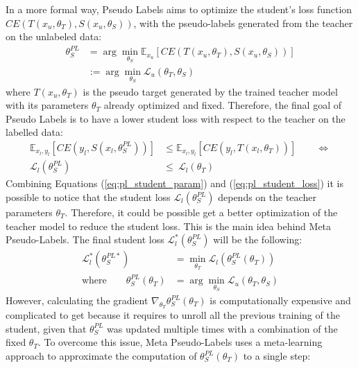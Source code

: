 In a more formal way, Pseudo Labels aims to optimize the student's 
loss function $CE(T(x_u, \theta_T), S(x_u, \theta_S))$, with the pseudo-labels 
generated from the teacher on the unlabeled data:
\begin{align}
    \theta_S^{PL} &= \arg \min_{\theta_S} \mathbb{E}_{x_u}\left[
        {CE(T(x_u, \theta_T), S(x_u, \theta_S))}\right] 
        \label{eq:pl_student_param}\\
        &:=
        \arg \min_{\theta_S} \mathcal{L}_u(\theta_T, \theta_S) \nonumber
\end{align}
where $T(x_u, \theta_T)$ is the pseudo target generated by the trained teacher 
model with its parameters $\theta_T$ already optimized and fixed. 
Therefore, the final goal of 
Pseudo Labels is to have a lower student loss with respect to the teacher on 
the labelled data:
\begin{align}
    \mathbb{E}_{x_l, y_l}\left[CE(y_l, S(x_l, \theta_S^{PL}))\right]
    &\leq
    \mathbb{E}_{x_l, y_l}\left[CE(y_l, T(x_l, \theta_T))\right]
    \qquad \Longleftrightarrow 
    \label{eq:pl_student_loss}\\
    \mathcal{L}_l(\theta_S^{PL})
    &\leq\
    \mathcal{L}_l(\theta_T) 
    \nonumber
\end{align}
Combining Equations (\ref{eq:pl_student_param}) and (\ref{eq:pl_student_loss}) 
it is possible to notice that the student loss $\mathcal{L}_l(\theta_S^{PL})$ 
depends on the teacher parameters $\theta_T$. Therefore, it could be possible 
get a better optimization of the teacher model to reduce the student loss. 
This is the main idea behind Meta Pseudo-Labels.
The final student loss $\mathcal{L}_l^*(\theta_S^{PL})$ will be the following:
\begin{align}
    \mathcal{L}^*_l(\theta_S^{PL*}) &= \min_{\theta_T} \mathcal{L}_l(\theta_S^{PL}(\theta_T))
    \label{eq:pl_student_loss_final} \\
    \text{where} \qquad \theta_S^{PL}(\theta_T) &= \arg\min_{\theta_S} \mathcal{L}_u(\theta_T, \theta_S)
    \nonumber
\end{align}
However, calculating the gradient $\nabla_{\theta_T}\theta^{PL}_S(\theta_T)$ 
is computationally expensive and complicated to get because it requires to 
unroll all the previous training of the student, given that $\theta_S^{PL}$ was updated 
multiple times with a combination of the fixed $\theta_T$.
To overcome this issue, Meta Pseudo-Labels uses a meta-learning approach to 
approximate  
the computation of $\theta_S^{PL}(\theta_T)$ to a single step:
